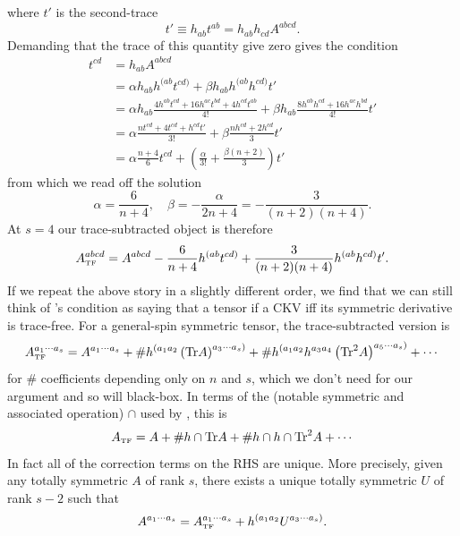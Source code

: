 \documentclass[11pt,letterpaper]{article}
\newcommand{\LP}{\left(}
\newcommand{\RP}{\right)}
\begin{document}
where $t'$ is the second-trace \begin{equation}
t' \equiv h_{ab} t^{ab} = h_{ab} h_{cd} A^{abcd}.
\end{equation}
Demanding that the trace of this quantity give zero gives the condition \begin{equation}
\begin{aligned}
t^{cd} & = h_{ab} A^{abcd} \\
& = \alpha h_{ab} h^{(ab} t^{cd)} + \beta h_{ab} h^{(ab} h^{cd)} t' \\
& = \alpha h_{ab} \frac{4 h^{ab} t^{cd} + 16 h^{ac} t^{bd} + 4h^{cd} t^{ab}}{4!} + \beta h_{ab} \frac{8 h^{ab} h^{cd} + 16 h^{ac} h^{bd}}{4!} t' \\
& = \alpha \frac{n t^{cd} + 4 t^{cd} + h^{cd} t'}{3!} + \beta \frac{n h^{cd} + 2 h^{cd}}{3} t' \\
& = \alpha \frac{n+4}{6} t^{cd} + \LP \frac{\alpha}{3!} + \frac{\beta(n + 2)}{3} \RP t'
\end{aligned}
\end{equation}
from which we read off the solution \begin{equation}
\alpha = \frac{6}{n+4}, \quad \beta = - \frac{\alpha}{2n + 4} = - \frac{3}{(n+2)(n+4)}.
\end{equation}
At $s = 4$ our trace-subtracted object is therefore \begin{equation}
A^{abcd}_{\mbox{\tiny{TF}}} = A^{abcd} - \frac{6}{n+4} h^{(ab} t^{cd)} + \frac{3}{(n+2)(n+4)} h^{(ab} h^{cd)} t'.
\end{equation}
If we repeat the above story in a slightly different order, we find that we can still think of \cite{Geroch:1970cc}'s condition as saying that a tensor if a CKV iff its symmetric derivative is trace-free. For a general-spin symmetric tensor, the trace-subtracted version is \begin{equation}
A^{a_1 \cdots a_s}_{\mbox{\tiny{TF}}} = A^{a_1 \cdots a_s} + \# h^{(a_1 a_2} \LP \mbox{Tr} A \RP^{a_3 \cdots a_s)} + \# h^{(a_1 a_2} h^{a_3 a_4} \LP \mbox{Tr}^2 A \RP^{a_5 \cdots a_s)} + \cdots
\end{equation}
for $\#$ coefficients depending only on $n$ and $s$, which we don't need for our argument and so will black-box. In terms of the (notable symmetric and associated operation) $\cap$ used by \cite{Geroch:1970cc}, this is \begin{equation}
A_{\mbox{\tiny{TF}}} = A + \# h \cap  \mbox{Tr} A + \# h \cap h \cap \mbox{Tr}^2 A + \cdots
\end{equation}
In fact all of the correction terms on the RHS are unique. More precisely, given any totally symmetric $A$ of rank $s$, there exists a unique totally symmetric $U$ of rank $s - 2$ such that \begin{equation}
A^{a_1 \cdots a_s} = A^{a_1 \cdots a_s}_{\mbox{\tiny{TF}}} + h^{(a_1 a_2} U^{a_3 \cdots a_s)}.
\end{equation}
\end{document}
